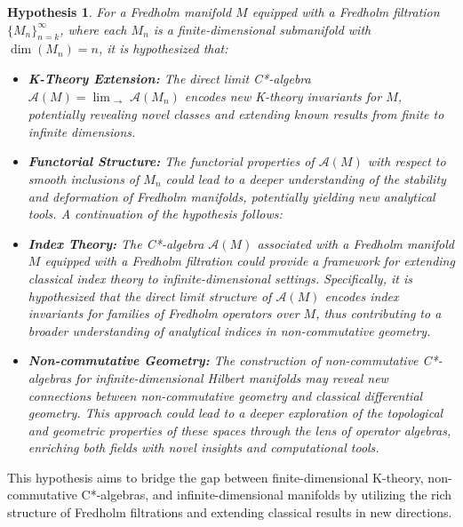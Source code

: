 \documentclass[11pt, twoside, a4paper]{article}
\theoremstyle{mytheoremstyle}
\newtheorem{hypothesis}[theorem]{Hypothesis}
\begin{document}
\begin{hypothesis}
For a Fredholm manifold \( M \) equipped with a Fredholm filtration \( \{M_{n}\}_{n=k}^{\infty} \), where each \( M_{n} \) is a finite-dimensional submanifold with \( \operatorname{dim}(M_{n}) = n \), it is hypothesized that:

\begin{itemize}

\item \textbf{K-Theory Extension:} 
The direct limit C*-algebra \( \mathcal{A}(M) = \lim_{\substack{\to}} \mathcal{A}(M_{n}) \) encodes new K-theory invariants for \( M \), potentially revealing novel classes and extending known results from finite to infinite dimensions.

\item \textbf{Functorial Structure:} 
The functorial properties of \( \mathcal{A}(M) \) with respect to smooth inclusions of \( M_{n} \) could lead to a deeper understanding of the stability and deformation of Fredholm manifolds, potentially yielding new analytical tools.
A continuation of the hypothesis follows:

\item \textbf{Index Theory:}
The C*-algebra \( \mathcal{A}(M) \) associated with a Fredholm manifold \( M \) equipped with a Fredholm filtration could provide a framework for extending classical index theory to infinite-dimensional settings. Specifically, it is hypothesized that the direct limit structure of \( \mathcal{A}(M) \) encodes index invariants for families of Fredholm operators over \( M \), thus contributing to a broader understanding of analytical indices in non-commutative geometry.

\item \textbf{Non-commutative Geometry:}
The construction of non-commutative C*-algebras for infinite-dimensional Hilbert manifolds may reveal new connections between non-commutative geometry and classical differential geometry. This approach could lead to a deeper exploration of the topological and geometric properties of these spaces through the lens of operator algebras, enriching both fields with novel insights and computational tools.
\end{itemize}
\end{hypothesis}
This hypothesis aims to bridge the gap between finite-dimensional K-theory, non-commutative C*-algebras, and infinite-dimensional manifolds by utilizing the rich structure of Fredholm filtrations and extending classical results in new directions.

\newpage
\thispagestyle{empty} %
\printbibliography
\end{document}

